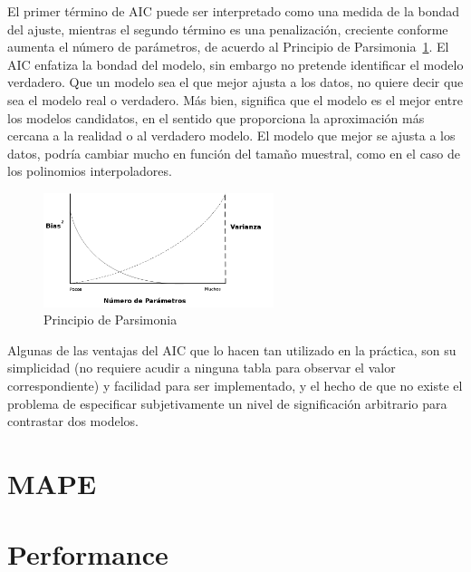 El primer término de AIC puede ser interpretado como una medida de la bondad
del ajuste, mientras el segundo término es una penalización, creciente conforme
aumenta el número de parámetros, de acuerdo al Principio de
Parsimonia~\ref{fig:parsimony}. El AIC enfatiza la bondad del modelo, sin
embargo no pretende identificar el modelo verdadero. Que un modelo sea el que
mejor ajusta a los datos, no quiere decir que sea el modelo real o verdadero.
Más bien, significa que el modelo es el mejor entre los modelos candidatos, en
el sentido que proporciona la aproximación más cercana a la realidad o al
verdadero modelo. El modelo que mejor se ajusta a los datos, podría cambiar
mucho en función del tamaño muestral, como en el caso de los polinomios
interpoladores. 

\begin{figure}[h!t]
    \begin{center}
        \includegraphics[width=0.6\textwidth]{images/parsimony}
        \caption{Principio de Parsimonia}
        \label{fig:parsimony}
    \end{center}
\end{figure}



Algunas de las ventajas del AIC que lo hacen tan utilizado en la práctica, son
su simplicidad (no requiere acudir a ninguna tabla para observar el valor
correspondiente) y facilidad para ser implementado, y el hecho de que no existe
el problema de especificar subjetivamente un nivel de significación arbitrario
para contrastar dos modelos.


\section{MAPE}

\section{Performance}

